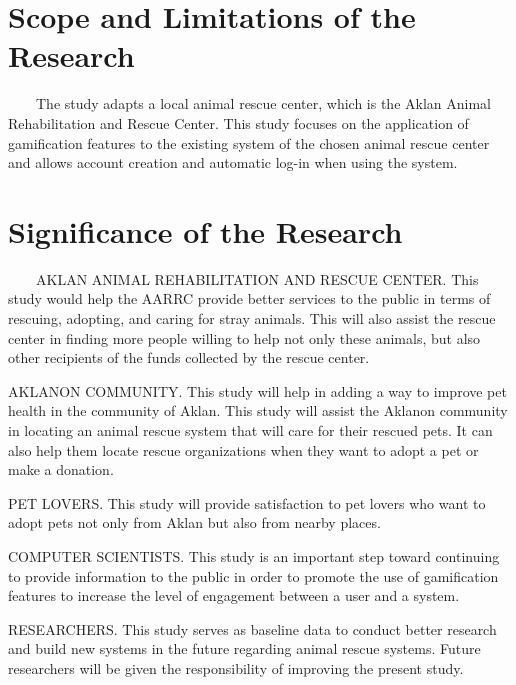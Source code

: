 \section{Scope and Limitations of the Research}
\label{sec:scopelimitations}

~~~~The study adapts a local animal rescue center, which is the Aklan Animal Rehabilitation and Rescue Center. This study focuses on the application of gamification features to the existing system of the chosen animal rescue center and allows account creation and automatic log-in when using the system.

\begin{comment}

%
%
Generally, one paragraph should be allotted for each of your research objectives.

Each paragraph contains a brief overview of the concept/theory and the purpose of doing the associated objective.

Each paragraph also includes a description of the scope/limitation of your study.

* Please refer to the slides for examples.

\end{comment}


\section{Significance of the Research}
\label{sec:significance}

~~~~AKLAN ANIMAL REHABILITATION AND RESCUE CENTER. This study would help the AARRC provide better services to the public in terms of rescuing, adopting, and caring for stray animals. This will also assist the rescue center in finding more people willing to help not only these animals, but also other recipients of the funds collected by the rescue center.

AKLANON COMMUNITY. This study will help in adding a way to improve pet health in the community of Aklan. This study will assist the Aklanon community in locating an animal rescue system that will care for their rescued pets. It can also help them locate rescue organizations when they want to adopt a pet or make a donation.

PET LOVERS. This study will provide satisfaction to pet lovers who want to adopt pets not only from Aklan but also from nearby places.

COMPUTER SCIENTISTS. This study is an important step toward continuing to provide information to the public in order to promote the use of gamification features to increase the level of engagement between a user and a system.

RESEARCHERS. This study serves as baseline data to conduct better research and build new systems in the future regarding animal rescue systems. Future researchers will be given the responsibility of improving the present study.



%
%


